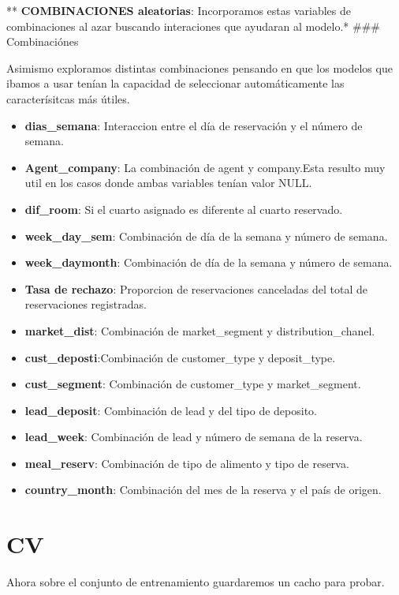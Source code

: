 \documentclass[
]{book}
\begin{document}
** \textbf{COMBINACIONES aleatorias}: Incorporamos estas variables de combinaciones al azar buscando interaciones que ayudaran al modelo.*
\#\#\# Combinaciónes

Asimismo exploramos distintas combinaciones pensando en que los modelos que ibamos a usar tenían la capacidad de seleccionar automáticamente las caracterísitcas más útiles.

\begin{itemize}
\item
  \textbf{dias\_semana}: Interaccion entre el día de reservación y el número de semana.
\item
  \textbf{Agent\_company}: La combinación de agent y company.Esta resulto muy util en los casos donde ambas variables tenían valor NULL.
\item
  \textbf{dif\_room}: Si el cuarto asignado es diferente al cuarto reservado.
\item
  \textbf{week\_day\_sem}: Combinación de día de la semana y número de semana.
\item
  \textbf{week\_daymonth}: Combinación de día de la semana y número de semana.
\item
  \textbf{Tasa de rechazo}: Proporcion de reservaciones canceladas del total de reservaciones registradas.
\item
  \textbf{market\_dist}: Combinación de market\_segment y distribution\_chanel.
\item
  \textbf{cust\_deposti}:Combinación de customer\_type y deposit\_type.
\item
  \textbf{cust\_segment}: Combinación de customer\_type y market\_segment.
\item
  \textbf{lead\_deposit}: Combinación de lead y del tipo de deposito.
\item
  \textbf{lead\_week}: Combinación de lead y número de semana de la reserva.
\item
  \textbf{meal\_reserv}: Combinación de tipo de alimento y tipo de reserva.
\item
  \textbf{country\_month}: Combinación del mes de la reserva y el país de origen.
\end{itemize}

\hypertarget{cv}{%
\section{CV}\label{cv}}

Ahora sobre el conjunto de entrenamiento guardaremos un cacho para probar.
\end{document}
